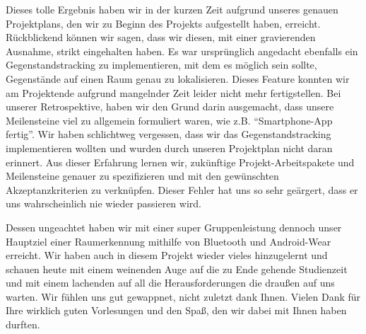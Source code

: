 Dieses tolle Ergebnis haben wir in der kurzen Zeit aufgrund unseres genauen Projektplans, den wir zu Beginn des Projekts aufgestellt haben, erreicht. Rückblickend können wir sagen, dass wir diesen, mit einer gravierenden Ausnahme, strikt eingehalten haben. Es war ursprünglich angedacht ebenfalls ein Gegenstandstracking zu implementieren, mit dem es möglich sein sollte, Gegenstände auf einen Raum genau zu lokalisieren. Dieses Feature konnten wir am Projektende aufgrund mangelnder Zeit leider nicht mehr fertigstellen. Bei unserer Retrospektive, haben wir den Grund darin ausgemacht, dass unsere Meilensteine viel zu allgemein formuliert waren, wie z.B. “Smartphone-App fertig”. Wir haben schlichtweg vergessen, dass wir das Gegenstandstracking implementieren wollten und wurden durch unseren Projektplan nicht daran erinnert. Aus dieser Erfahrung lernen wir, zukünftige Projekt-Arbeitspakete und Meilensteine genauer zu spezifizieren und mit den gewünschten Akzeptanzkriterien zu verknüpfen. Dieser Fehler hat uns so sehr geärgert, dass er uns wahrscheinlich nie wieder passieren wird.

Dessen ungeachtet haben wir mit einer super Gruppenleistung dennoch unser Hauptziel einer Raumerkennung mithilfe von Bluetooth und Android-Wear erreicht. Wir haben auch in diesem Projekt wieder vieles hinzugelernt und schauen heute mit einem weinenden Auge auf die zu Ende gehende Studienzeit und mit einem lachenden auf all die Herausforderungen die draußen auf uns warten. Wir fühlen uns gut gewappnet, nicht zuletzt dank Ihnen. Vielen Dank für Ihre wirklich guten Vorlesungen und den Spaß, den wir dabei mit Ihnen haben durften. 
